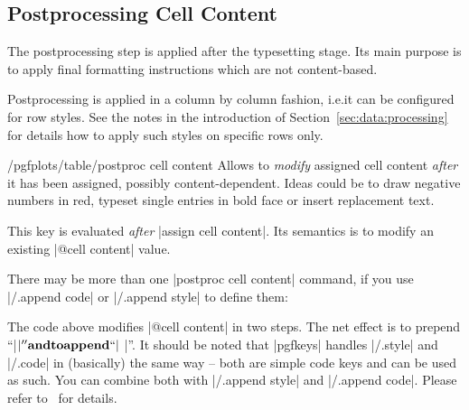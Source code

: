 \documentclass[a4paper]{ltxdoc}
\begin{document}
\subsection{Postprocessing Cell Content}

The postprocessing step is applied after the typesetting stage. Its main
purpose is to apply final formatting instructions which are not content-based.

Postprocessing is applied in a column by column fashion, i.e.\@ it can be
configured for row styles. See the notes in the introduction of
Section~\ref{sec:data:processing} for details how to apply such styles on
specific rows only.

\begin{codekey}{/pgfplots/table/postproc cell content}
    Allows to \emph{modify} assigned cell content \emph{after} it has been
    assigned, possibly content-dependent. Ideas could be to draw negative
    numbers in red, typeset single entries in bold face or insert replacement
    text.

    This key is evaluated \emph{after} |assign cell content|. Its semantics is
    to modify an existing |@cell content| value.

    There may be more than one |postproc cell content| command, if you use
    |/.append code| or |/.append style| to define them:
\begin{codeexample}[]
\end{codeexample}
    The code above modifies |@cell content| in two steps. The net effect is to
    prepend ``|$\bf |'' and to append ``|$ \EUR|''. It should be noted that
    |pgfkeys| handles |/.style| and |/.code| in (basically) the same way --
    both are simple code keys and can be used as such. You can combine both
    with |/.append style| and |/.append code|. Please refer to~\cite[section
    about pgfkeys]{tikz} for details.


\end{codekey}
\end{document}
